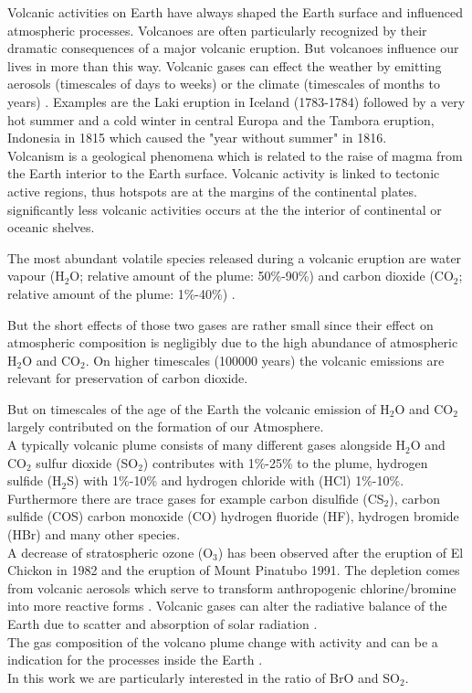 
Volcanic activities on Earth have always shaped the Earth  surface and influenced atmospheric processes. Volcanoes are often particularly recognized by their dramatic consequences of a major volcanic eruption. But volcanoes influence our lives in more than this way. Volcanic gases can effect the weather by emitting aerosols (timescales of days to weeks) or the climate (timescales of months to years) \cite{schmidt2015volcanismarticle}.
Examples are the Laki eruption in Iceland (1783-1784) followed by a very hot summer and a cold winter in central Europa \cite{thordarson2003atmospheric} and the Tambora eruption, Indonesia in 1815 which caused the "year without summer" in 1816.\\
%
\newline
%
Volcanism is a geological phenomena which is related to the raise of magma  from the Earth  interior to the Earth  surface. Volcanic activity is linked to tectonic active regions, thus hotspots are at the margins of the continental plates.
significantly less volcanic activities occurs at the the interior of continental or oceanic shelves. \cite{schmincke2000vulkanismus}

The most abundant volatile species released during a volcanic eruption are water vapour (H$_2$O; relative amount of the plume: 50\%-90\%) and carbon dioxide (CO$_2$; relative amount of the plume: 1\%-40\%) \cite{platt2015quantification}. 

But the short effects of those two gases are rather small since their effect on atmospheric composition is negligibly due to the high abundance of atmospheric H$_2$O and CO$_2$. 
On higher timescales (100000 years) the volcanic emissions are relevant for preservation of carbon dioxide. 

But on timescales of the age of the Earth  the volcanic emission of H$_2$O and CO$_2$ largely contributed on the formation of our Atmosphere. \cite{schmidt2015volcanism}\\ 

A typically volcanic plume consists of many different gases alongside H$_2$O and CO$_2$  sulfur dioxide (SO$_2$) contributes with 1\%-25\% to the plume, hydrogen sulfide (H$_2$S) with 1\%-10\% and hydrogen chloride with (HCl) 1\%-10\%. Furthermore there are trace gases for example carbon disulfide (CS$_2$), carbon sulfide (COS) carbon monoxide (CO) hydrogen fluoride (HF), hydrogen bromide (HBr) and many other species. \cite{platt2015quantification}\\
%
A decrease of stratospheric ozone (O$_3$) has been observed after the eruption of  El Chickon in 1982 and the eruption of Mount Pinatubo 1991. The depletion comes from volcanic aerosols which serve to transform anthropogenic chlorine/bromine into more reactive forms \cite{solomon1998ozone}. 
%
Volcanic gases can alter the radiative balance of the Earth  due to scatter and absorption of solar radiation \cite{schmidt2015volcanism}.\\
%
The gas composition of the volcano plume change with activity and can be a indication for the processes inside the Earth .\\ 
%
In this work we are particularly interested in the ratio of BrO and SO$_2$.
 
